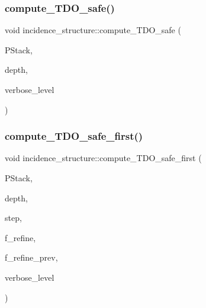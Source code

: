\mbox{\label{classincidence__structure_ab1409e71c4b6855e49edfd3526644202}} 
\subsubsection{\texorpdfstring{compute\+\_\+\+T\+D\+O\+\_\+safe()}{compute\_TDO\_safe()}}
{\footnotesize\ttfamily void incidence\+\_\+structure\+::compute\+\_\+\+T\+D\+O\+\_\+safe (\begin{DoxyParamCaption}\item[{\mbox{\hyperlink{classpartitionstack}{partitionstack}} \&}]{P\+Stack,  }\item[{\mbox{\hyperlink{galois_8h_a09fddde158a3a20bd2dcadb609de11dc}{I\+NT}}}]{depth,  }\item[{\mbox{\hyperlink{galois_8h_a09fddde158a3a20bd2dcadb609de11dc}{I\+NT}}}]{verbose\+\_\+level }\end{DoxyParamCaption})}

\mbox{\label{classincidence__structure_aa84c3d810b1b3cfa8395ccdac1392017}} 
\subsubsection{\texorpdfstring{compute\+\_\+\+T\+D\+O\+\_\+safe\+\_\+first()}{compute\_TDO\_safe\_first()}}
{\footnotesize\ttfamily void incidence\+\_\+structure\+::compute\+\_\+\+T\+D\+O\+\_\+safe\+\_\+first (\begin{DoxyParamCaption}\item[{\mbox{\hyperlink{classpartitionstack}{partitionstack}} \&}]{P\+Stack,  }\item[{\mbox{\hyperlink{galois_8h_a09fddde158a3a20bd2dcadb609de11dc}{I\+NT}}}]{depth,  }\item[{\mbox{\hyperlink{galois_8h_a09fddde158a3a20bd2dcadb609de11dc}{I\+NT}} \&}]{step,  }\item[{\mbox{\hyperlink{galois_8h_a09fddde158a3a20bd2dcadb609de11dc}{I\+NT}} \&}]{f\+\_\+refine,  }\item[{\mbox{\hyperlink{galois_8h_a09fddde158a3a20bd2dcadb609de11dc}{I\+NT}} \&}]{f\+\_\+refine\+\_\+prev,  }\item[{\mbox{\hyperlink{galois_8h_a09fddde158a3a20bd2dcadb609de11dc}{I\+NT}}}]{verbose\+\_\+level }\end{DoxyParamCaption})}

